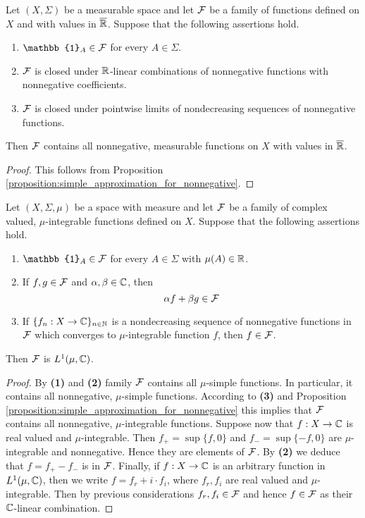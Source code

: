 \begin{corollary}\label{corollary:measurable_induction_for_nonnegative}
    Let $(X,\Sigma)$ be a measurable space and let ${\mathcal F}$ be a family of functions defined on $X$ and with values in $\overline{{\mathbb R}}$. Suppose that the following assertions hold.
    \begin{enumerate}[label=\emph{\textbf{(\arabic*)}}, leftmargin=*]
        \item $\mathbb{1}_A\in \cF$ for every $A\in \Sigma$.
        \item ${\mathcal F}$ is closed under ${\mathbb R}$-linear combinations of nonnegative functions with nonnegative coefficients.
        \item ${\mathcal F}$ is closed under pointwise limits of nondecreasing sequences of nonnegative functions.
    \end{enumerate}
    Then ${\mathcal F}$ contains all nonnegative, measurable functions on $X$ with values in $\overline{{\mathbb R}}$.
\end{corollary}
\begin{proof}
    This follows from Proposition \ref{proposition:simple_approximation_for_nonnegative}.
\end{proof}

\begin{corollary}\label{corollary:measurable_induction_for_complex}
    Let $(X,\Sigma,\mu)$ be a space with measure and let ${\mathcal F}$ be a family of complex valued, $\mu$-integrable functions defined on $X$. Suppose that the following assertions hold.
    \begin{enumerate}[label=\emph{\textbf{(\arabic*)}}, leftmargin=*]
        \item $\mathbb{1}_A\in \cF$ for every $A\in \Sigma$ with $\mu(A)\in {\mathbb R}$.
        \item If $f, g\in {\mathcal F}$ and $\alpha, \beta\in {\mathbb C}$, then
              $$\alpha f + \beta g\in {\mathcal F}$$
        \item If $\{f_n:X\rightarrow {\mathbb C}\}_{n\in {\mathbb N}}$ is a nondecreasing sequence of nonnegative functions in ${\mathcal F}$ which converges to $\mu$-integrable function $f$, then $f\in {\mathcal F}$.
    \end{enumerate}
    Then ${\mathcal F}$ is $L^1(\mu, {\mathbb C})$.
\end{corollary}
\begin{proof}
    By \textbf{(1)} and \textbf{(2)} family ${\mathcal F}$ contains all $\mu$-simple functions. In particular, it contains all nonnegative, $\mu$-simple functions. According to \textbf{(3)} and Proposition \ref{proposition:simple_approximation_for_nonnegative} this implies that ${\mathcal F}$ contains all nonnegative, $\mu$-integrable functions. Suppose now that $f:X\rightarrow {\mathbb C}$ is real valued and $\mu$-integrable. Then $f_+ = \sup \{f, 0\}$ and $f_- = \sup\{-f, 0\}$ are $\mu$-integrable and nonnegative. Hence they are elements of ${\mathcal F}$. By \textbf{(2)} we deduce that $f = f_+ - f_-$ is in ${\mathcal F}$. Finally, if $f:X\rightarrow {\mathbb C}$ is an arbitrary function in $L^1(\mu, {\mathbb C})$, then we write $f = f_r + i\cdot f_i$, where $f_r, f_i$ are real valued and $\mu$-integrable. Then by previous considerations $f_r,f_i\in {\mathcal F}$ and hence $f\in {\mathcal F}$ as their ${\mathbb C}$-linear combination.
\end{proof}

